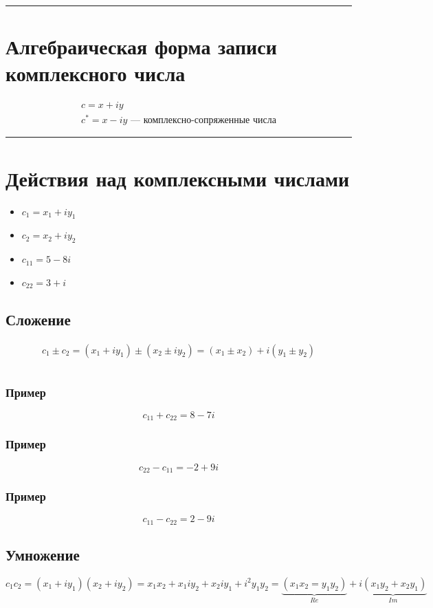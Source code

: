 \documentclass{article}
\begin{document}
\par\noindent\rule{\textwidth}{1pt}
\section{Алгебраическая форма записи комплексного числа}
\begin{gather*}
    c = x + iy \\
    c^* = x - iy \text{ --- комплексно-сопряженные числа}
\end{gather*}



\par\noindent\rule{\textwidth}{1pt}
\section{Действия над комплексными числами}
\begin{itemize}
    \item $c_1 = x_1 + iy_1$
    \item $c_2 = x_2 + iy_2$
    \item $c_{11} = 5 - 8i$
    \item $c_{22} = 3 + i$
\end{itemize}

\subsection{Сложение}
\begin{gather*}
    c_1 \pm c_2 = (x_1 + iy_1) \pm (x_2 \pm iy_2) = (x_1 \pm x_2) + i(y_1 \pm y_2) \\ \\
\end{gather*}

\subsubsection{Пример}
\[
    c_{11} + c_{22} = 8 - 7i
\]

\subsubsection{Пример}
\[
    c_{22} - c_{11} = -2 + 9i
\]

\subsubsection{Пример}
\[
    c_{11} - c_{22} = 2 - 9i
\]


\subsection{Умножение}
\[
    c_1 c_2 = (x_1 + iy_1)(x_2 + iy_2) = 
    x_1 x_2 + x_1 i y_2 + x_2 i y_1 + i^2 y_1 y_2 = 
    \underbrace{(x_1 x_2 = y_1 y_2)}_{Re} + \underbrace{i(x_1 y_2 + x_2 y_1)}_{Im}
\]
\end{document}
